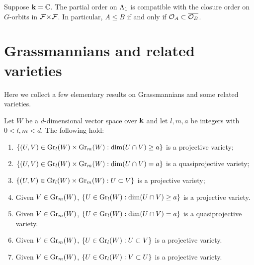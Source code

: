 \documentclass[a4paper, 11pt]{report}
\begin{document}
\begin{conjecture}
Suppose $\field=\complex$. The partial order on $\matrices$ is compatible with the closure order on $G$-orbits in $\dblflags$. In particular, $A\le B$ if and only if $\orbit{A}\subset \overline{\orbit{B}}$.
\end{conjecture}


\section{Grassmannians and related varieties}

Here we collect a few elementary results on Grassmannians and some related varieties.

\begin{lemma}
Let $W$ be a $d$-dimensional vector space over $\field$ and let $l,m,a$ be integers with $0<l,m<d$. The following hold:
\begin{enumerate}
\item
$\{(U,V)\in\GR[l]{W}\times\GR[m]{W}: \dim(U\cap V) \geq a\}$ is a projective variety;
\item
$\{(U,V)\in\GR[l]{W}\times\GR[m]{W}: \dim(U\cap V) = a\}$ is a quasiprojective variety;
\item
$\{(U,V)\in\GR[l]{W}\times\GR[m]{W}: U\subset V\}$ is a projective variety;
\item
Given $V\in\GR[m]{W}$, $\{U\in\GR[l]{W}: \dim(U\cap V)\geq a\}$ is a projective variety.
\item
Given $V\in\GR[m]{W}$, $\{U\in\GR[l]{W}:\dim(U\cap V) = a\}$ is a quasiprojective variety.
\item
Given $V\in\GR[m]{W}$, $\{U\in\GR[l]{W}:U\subset V\}$ is a projective variety.
\item
Given $V\in\GR[m]{W}$, $\{U\in\GR[l]{W}:V\subset U\}$ is a projective variety.
\end{enumerate}
\end{lemma}
\end{document}
